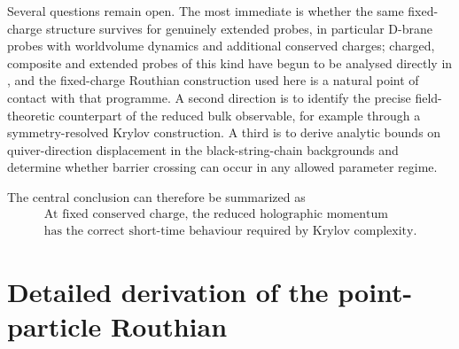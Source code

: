 \documentclass[11pt,a4paper]{article}
\theoremstyle{plain}
\theoremstyle{definition}
\theoremstyle{remark}
\begin{document}
Several questions remain open. The most immediate is whether the same fixed-charge structure survives for genuinely extended probes, in particular D-brane probes with worldvolume dynamics and additional conserved charges; charged, composite and extended probes of this kind have begun to be analysed directly in \cite{Nastase:2026lhz}, and the fixed-charge Routhian construction used here is a natural point of contact with that programme. A second direction is to identify the precise field-theoretic counterpart of the reduced bulk observable, for example through a symmetry-resolved Krylov construction. A third is to derive analytic bounds on quiver-direction displacement in the black-string-chain backgrounds and determine whether barrier crossing can occur in any allowed parameter regime.

The central conclusion can therefore be summarized as
\begin{equation*}
\boxed{
\begin{gathered}
\text{At fixed conserved charge, the reduced holographic momentum}\\
\text{has the correct short-time behaviour required by Krylov complexity.}
\end{gathered}}
\end{equation*}

\appendix
\section{Detailed derivation of the point-particle Routhian}
\label{app:routhian-detail}
\end{document}
